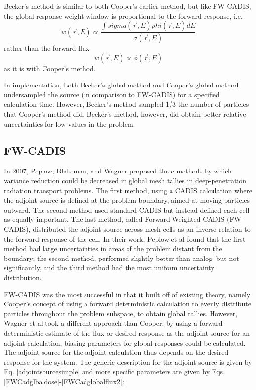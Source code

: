 Becker's method is similar to both Cooper's earlier method, but like FW-CADIS,
the global response weight window is proportional to the forward response, i.e.
\begin{equation}
  \bar{w}(\vec{r},E) \propto \frac{\int sigma(\vec{r},E) phi (\vec{r},E) dE}
                                  {\sigma (\vec{r},E)}
\end{equation}
rather than the forward flux
\begin{equation}
  \bar{w}(\vec{r},E) \propto \phi(\vec{r},E)
\end{equation}
 as it is with Cooper's method.

 In implementation, both Becker's global method and Cooper's global method
 undersampled the source (in comparison to FW-CADIS) for a specified calculation
 time. However, Becker's method sampled 1/3 the number of particles that
 Cooper's method did. Becker's method, however, did obtain better relative
 uncertainties for low values in the problem.

\subsection{FW-CADIS}
\label{subsec:FWCADIS}

In 2007, Peplow, Blakeman, and Wagner \cite{peplow_advanced_2007} proposed three
methods by which variance reduction could be decreased in global mesh tallies in
deep-penetration radiation transport problems. The first method, using a CADIS
calculation where the adjoint source is defined at the problem boundary, aimed
at moving particles outward. The second method used standard CADIS but instead
defined each cell as equally important. The last method, called Forward-Weighted
CADIS (FW-CADIS), distributed the adjoint source across mesh cells as an inverse
relation to the forward response of the cell. In their work, Peplow et al found
that the first method had large uncertainties in areas of the problem distant
from the boundary; the second method, performed slightly better than analog, but
not significantly, and the third method had the most uniform uncertainty
distribution.

FW-CADIS
\cite{wagner_forward-weighted_2007,wagner_forward-weighted_2009,wagner_forward-weighted_2010}
was the most successful in that it built off of existing theory, namely Cooper's
concept of using a forward deterministic calculation to evenly distribute
particles throughout the problem subspace, to obtain global tallies. However,
Wagner et al took a different approach than Cooper: by using a forward
deterministic estimate of the flux or desired response as the adjoint source for
an adjoint calculation, biasing parameters for global responses could be
calculated. The adjoint source for the adjoint calculation thus depends on the
desired response for the system. The generic description for the adjoint source
is given by Eq. \eqref{adjointsourcesimple} and more specific parameters are
given by Eqs. \eqref{FWCadglbaldose}-\eqref{FWCadglobalflux2}:

